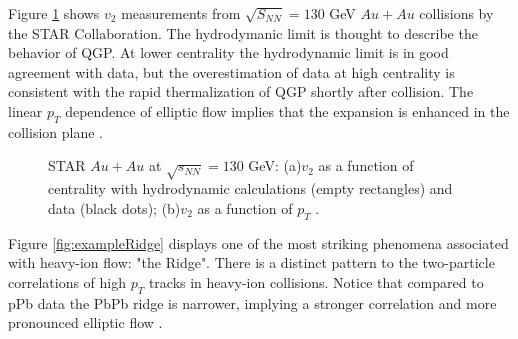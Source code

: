 Figure \ref{fig:exampleStarKine} shows $v_2$ measurements from $\sqrt{S_{NN}}=130$ GeV $Au+Au$ collisions by the STAR Collaboration. The hydrodymanic limit is thought to describe the behavior of QGP. At lower centrality the hydrodynamic limit is in good agreement with data, but the overestimation of data at high centrality is consistent with the rapid thermalization of QGP shortly after collision. The linear $p_T$ dependence of elliptic flow implies that the expansion is enhanced in the collision plane \cite{Ackermann:200tr}. 

\begin{figure}%
    \centering
    \qquad
    \caption{STAR $Au+Au$ at $\sqrt{s_{NN}}=130$ GeV: (a)$v_2$ as a function of centrality with hydrodynamic calculations (empty rectangles) and data (black dots); (b)$v_2$ as a function of $p_T$ \cite{Ackermann:2000tr}.}%
    \label{fig:exampleStarKine}%
\end{figure}

Figure \ref{fig:exampleRidge} displays one of the most striking phenomena associated with heavy-ion flow: "the Ridge". There is a distinct pattern to the two-particle correlations of high $p_T$ tracks in heavy-ion collisions. Notice that compared to pPb data the PbPb ridge is narrower, implying a stronger correlation and more pronounced elliptic flow \cite{Chatrchyan:2013nka}. 


